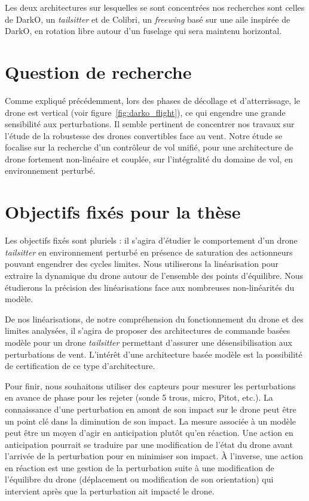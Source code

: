Les deux architectures sur lesquelles se sont concentrées nos recherches sont celles de DarkO, un \textit{tailsitter} et de Colibri, un \textit{freewing} basé sur une aile inspirée de DarkO, en rotation libre autour d'un fuselage qui sera maintenu horizontal.


\section*{Question de recherche}

Comme expliqué précédemment, lors des phases de décollage et d'atterrissage, le drone est vertical (voir figure~\ref{fig:darko_flight}), ce qui engendre une grande sensibilité aux perturbations. Il semble pertinent de concentrer nos travaux sur l'étude de la robustesse des drones convertibles face au vent.
Notre étude se focalise sur la recherche d'un contrôleur de vol unifié, pour une architecture de drone fortement non-linéaire et couplée, sur l'intégralité du domaine de vol, en environnement perturbé.

\section*{Objectifs fixés pour la thèse}
Les objectifs fixés sont pluriels : il s'agira d'étudier le comportement d'un drone \textit{tailsitter} en environnement perturbé en présence de saturation des actionneurs pouvant engendrer des cycles limites. Nous utiliserons la linéarisation pour extraire la dynamique du drone autour de l'ensemble des points d'équilibre. Nous étudierons la précision des linéarisations face aux nombreuses non-linéarités du modèle. 

De nos linéarisations, de notre compréhension du fonctionnement du drone et des limites analysées, il s'agira de proposer des architectures de commande basées modèle pour un drone \textit{tailsitter} permettant d'assurer une désensibilisation aux perturbations de vent. L'intérêt d'une architecture basée modèle est la possibilité de certification de ce type d'architecture. 

Pour finir, nous souhaitons utiliser des capteurs pour mesurer les perturbations en avance de phase pour les rejeter (sonde 5 trous, micro, Pitot, etc.). La connaissance d'une perturbation en amont de son impact sur le drone peut être un point clé dans la diminution de son impact. La mesure associée à un modèle peut être un moyen d'agir en anticipation plutôt qu'en réaction. Une action en anticipation pourrait se traduire par une modification de l'état du drone avant l'arrivée de la perturbation pour en minimiser son impact. À l'inverse, une action en réaction est une gestion de la perturbation suite à une modification de l'équilibre du drone (déplacement ou modification de son orientation) qui intervient après que la perturbation ait impacté le drone.  

